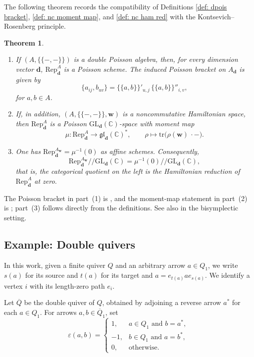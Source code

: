 \documentclass[11pt,reqno]{amsart}
\newtheorem{theorem}{Theorem}[section]
\theoremstyle{definition}
\newcommand{\bbC}{\mathbb{C}}
\newcommand{\gl}{\mathfrak{gl}}
\newcommand{\GL}{\mathrm{GL}}
\newcommand{\tos}{\mapsto}
\newcommand{\Rep}{\mathrm{Rep}}
\newcommand{\bd}{\mathbf{d}}
\newcommand{\DQ}{\overline{Q}}
\newcommand{\ldb}{\mathopen{\{\!\!\{}}
\newcommand{\rdb}{\mathclose{\}\!\!\}}}
\newcommand{\bw}{\mathbf{w}}
\newcommand{\tr}{\mathrm{tr}}
\begin{document}
The following theorem records the compatibility of Definitions \ref{def: dpois bracket}, \ref{def: nc moment map}, and \ref{def: nc ham red} with the Kontsevich--Rosenberg principle.


\begin{theorem}
\begin{enumerate}
\item[$(1)$]
If \((A,\ldb-,-\rdb)\) is a double Poisson algebra, then, for every dimension vector \(\bd\), \(\mathrm{Rep}_{\mathbf{d}}^A\) is a Poisson scheme. The induced Poisson bracket on \(A_\bd\) is given by
\begin{equation*}
\{a_{ij},b_{uv}\}=\ldb a,b\rdb'_{u,j}\,\ldb a,b\rdb''_{i,v},
\end{equation*}
for \(a,b\in A\).

\item[$(2)$]
If, in addition, \((A,\ldb-,-\rdb,\bw)\) is a noncommutative Hamiltonian space, then \(\Rep^A_\bd\) is a Poisson \(\GL_\bd(\bbC)\)-space with moment map
\[
\mu\colon\Rep^A_\bd\to\gl_\bd(\bbC)^*,
\qquad
\rho\tos\tr\bigl(\rho(\bw)\,\cdot-\bigr).
\]

\item[$(3)$]
One has \(\Rep^{A_\bw}_\bd=\mu^{-1}(0)\) as affine schemes. Consequently,
\[
\Rep^{A_\bw}_\bd//\GL_\bd(\bbC)
=
\mu^{-1}(0)//\GL_\bd(\bbC),
\]
that is, the categorical quotient on the left is the Hamiltonian reduction of \(\Rep^A_\bd\) at zero.
\end{enumerate}
\end{theorem}
The  {Poisson bracket in part~\textup{(1)} is
\cite[Proposition~7.5.2]{Van2008Double}, and the moment-map statement
in part~\textup{(2)} is \cite[Proposition~7.11.1]{Van2008Double};
part~\textup{(3)} follows directly from the definitions.  See also
\cite[Theorem~6.4.3]{CBEG2007} in the bisymplectic setting}.





\subsection{Example:
Double quivers}\label{subsec: necklace}



In this work, given a finite quiver \(Q\) and an arbitrary arrow \(a\in Q_1\), we write \(s(a)\) for its source and \(t(a)\) for its target and \(a = e_{t(a)} a e_{s(a)}\).
{We identify a vertex} {\(i\)} {with its length-zero path}
{\(e_i\)}.

Let \(\DQ\) be the double quiver of \(Q\), obtained by adjoining a reverse arrow \(a^*\) for each \(a\in Q_1\).
For arrows \(a,b\in\overline{Q}_1\), set
\[
\varepsilon(a,b)
=
\begin{cases}
  1,& a\in Q_1\text{ and }b=a^*,\\
 -1,& b\in Q_1\text{ and }a=b^*,\\
  0,& \text{otherwise}.
\end{cases}
\]
\end{document}
